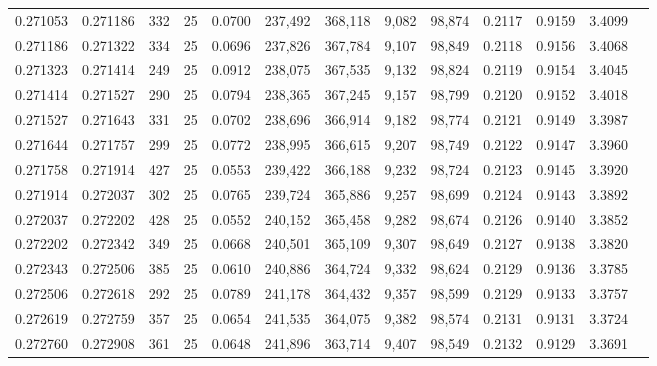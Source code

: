\begin{tabular}{rrrrrrrrrrrrr}
0.271053 & 0.271186 &   332 &  25 &                                     0.0700 & 237,492 & 368,118 &   9,082 &  98,874 & 0.2117 & 0.9159 & 3.4099 \\
0.271186 & 0.271322 &   334 &  25 &                                     0.0696 & 237,826 & 367,784 &   9,107 &  98,849 & 0.2118 & 0.9156 & 3.4068 \\
0.271323 & 0.271414 &   249 &  25 &                                     0.0912 & 238,075 & 367,535 &   9,132 &  98,824 & 0.2119 & 0.9154 & 3.4045 \\
0.271414 & 0.271527 &   290 &  25 &                                     0.0794 & 238,365 & 367,245 &   9,157 &  98,799 & 0.2120 & 0.9152 & 3.4018 \\
0.271527 & 0.271643 &   331 &  25 &                                     0.0702 & 238,696 & 366,914 &   9,182 &  98,774 & 0.2121 & 0.9149 & 3.3987 \\
0.271644 & 0.271757 &   299 &  25 &                                     0.0772 & 238,995 & 366,615 &   9,207 &  98,749 & 0.2122 & 0.9147 & 3.3960 \\
0.271758 & 0.271914 &   427 &  25 &                                     0.0553 & 239,422 & 366,188 &   9,232 &  98,724 & 0.2123 & 0.9145 & 3.3920 \\
0.271914 & 0.272037 &   302 &  25 &                                     0.0765 & 239,724 & 365,886 &   9,257 &  98,699 & 0.2124 & 0.9143 & 3.3892 \\
0.272037 & 0.272202 &   428 &  25 &                                     0.0552 & 240,152 & 365,458 &   9,282 &  98,674 & 0.2126 & 0.9140 & 3.3852 \\
0.272202 & 0.272342 &   349 &  25 &                                     0.0668 & 240,501 & 365,109 &   9,307 &  98,649 & 0.2127 & 0.9138 & 3.3820 \\
0.272343 & 0.272506 &   385 &  25 &                                     0.0610 & 240,886 & 364,724 &   9,332 &  98,624 & 0.2129 & 0.9136 & 3.3785 \\
0.272506 & 0.272618 &   292 &  25 &                                     0.0789 & 241,178 & 364,432 &   9,357 &  98,599 & 0.2129 & 0.9133 & 3.3757 \\
0.272619 & 0.272759 &   357 &  25 &                                     0.0654 & 241,535 & 364,075 &   9,382 &  98,574 & 0.2131 & 0.9131 & 3.3724 \\
0.272760 & 0.272908 &   361 &  25 &                                     0.0648 & 241,896 & 363,714 &   9,407 &  98,549 & 0.2132 & 0.9129 & 3.3691 \\

\end{tabular}

